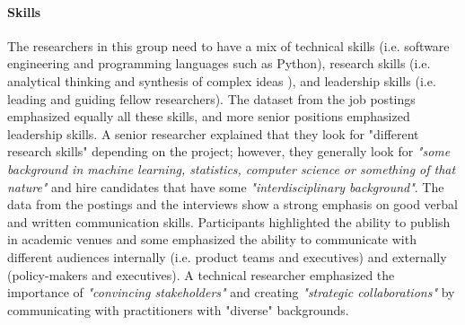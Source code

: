\documentclass[sigconf]{acmart}
\begin{document}
\paragraph{Skills}
The researchers in this group need to have a mix of technical skills (i.e. software engineering and programming languages such as Python), research skills (i.e. analytical thinking and synthesis of complex ideas ), and leadership skills (i.e. leading and guiding fellow researchers). The dataset from the job postings emphasized equally all these skills, and more senior positions emphasized leadership skills. A senior researcher explained that they look for "different research skills" depending on the project; however, they generally look for \textit{"some background in machine learning, statistics, computer science or something of that nature"} and hire candidates that have some \textit{"interdisciplinary background"}. The data from the postings and the interviews show a strong emphasis on good verbal and written communication skills. Participants highlighted the ability to publish in academic venues and some emphasized the ability to communicate with different audiences internally (i.e. product teams and executives) and externally (policy-makers and executives). A technical researcher emphasized the importance of\textit{ "convincing stakeholders"} and creating \textit{"strategic collaborations"} by communicating with practitioners with "diverse" backgrounds. 
\end{document}
